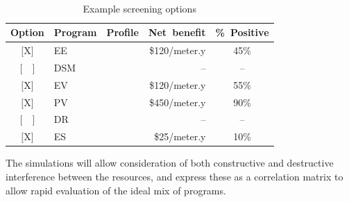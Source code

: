 \begin{table}[!t]
    \caption{Example screening options}
    \label{tab:screening}
    \centering
    ~\\
    \begin{tabular}{cllrc}
        \hline
        Option & Program & Profile & Net~benefit & \%~Positive
    \\  \hline \hline
        $[$X$]$ & EE && \$120/meter.y & 45\%
    \\  $[$~~$]$ & DSM && -- & --
    \\  $[$X$]$ & EV && \$120/meter.y & 55\%
    \\  $[$X$]$ & PV && \$450/meter.y & 90\%
    \\  $[$~~$]$ & DR && -- & --
    \\  $[$X$]$ & ES && \$25/meter.y & 10\%
    \\  \hline
    \end{tabular}
\end{table}
The simulations will allow consideration of both constructive and destructive interference between the resources, and express these as a correlation matrix to allow rapid evaluation of the ideal mix of programs. 

